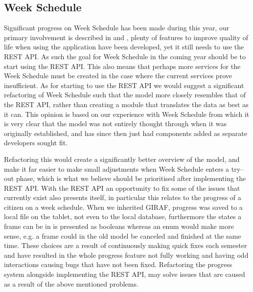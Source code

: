 \subsection*{Week Schedule}
Significant progress on Week Schedule has been made during this year, our primary involvement is described in  and , plenty of features to improve quality of life when using the application have been developed, yet it still needs to use the REST API.
As such the goal for Week Schedule in the coming year should be to start using the REST API.
This also means that perhaps more services for the Week Schedule must be created in the case where the current services prove insufficient.
As for starting to use the REST API we would suggest a significant refactoring of Week Schedule such that the model more closely resembles that of the REST API, rather than creating a module that translates the data as best as it can.
This opinion is based on our experience with Week Schedule from which it is very clear that the model was not entirely thought through when it was originally established, and has since then just had components added as separate developers sought fit.

Refactoring this would create a significantly better overview of the model, and make it far easier to make small adjustments when Week Schedule enters a try--out phase, which is what we believe should be prioritised after implementing the REST API.
With the REST API an opportunity to fix some of the issues that currently exist also presents itself, in particular this relates to the progress of a citizen on a week schedule.
When we inherited GIRAF, progress was saved to a local file on the tablet, not even to the local database, furthermore the states a frame can be in is presented as booleans whereas an enum would make more sense, e.g. a frame could in the old model be canceled and finished at the same time.
These choices are a result of continuously making quick fixes each semester and have resulted in the whole progress feature not fully working and having odd interactions causing bugs that have not been fixed.
Refactoring the progress system alongside implementing the REST API, may solve issues that are caused as a result of the above mentioned problems.

